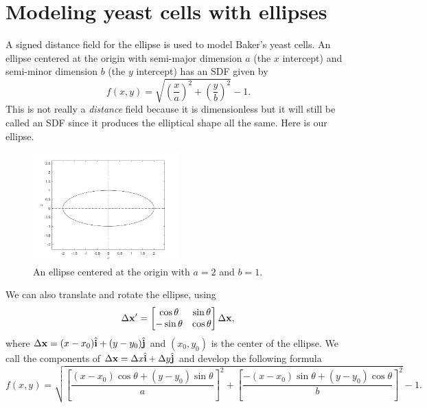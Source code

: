 \section{Modeling yeast cells with ellipses}
A signed distance field for the ellipse is used to model Baker's yeast cells.
An ellipse centered at the origin with semi-major dimension $a$ (the $x$ intercept) and
semi-minor dimension $b$ (the $y$ intercept) has an SDF given by
\begin{equation*}
    f(x,y) = \sqrt{ \left( \frac{x}{a} \right)^2 + \left( \frac{y}{b} \right)^2 } - 1.
\end{equation*}
This is not really a \textit{distance} field because it is 
dimensionless but it will still be called an SDF since it produces the 
elliptical shape all the same. Here is our ellipse.
\begin{figure}[h]
\centering
\includegraphics[width=0.5\textwidth]{chapter1/figures/ellipse_origin.jpg}
\caption{An ellipse centered at the origin with $a = 2$ and $b=1$.}
\label{fig:Ellipse_Centered}
\end{figure}
We can also translate and rotate the ellipse, using
\begin{equation*} 
    \Delta \vb{x}' = 
    \begin{bmatrix}
        \cos{\theta} & \sin{\theta} \\
        -\sin{\theta} & \cos{\theta} 
    \end{bmatrix}
    \Delta \vb{x},
\end{equation*}
where $\Delta \vb{x} = (x-x_0) \hat{\vb{i}} + (y-y_0)\hat{\vb{j}} $ and $(x_0,y_0)$ is the
center of the ellipse. We call the components of $\Delta \vb{x} = \Delta x \hat{\vb{i}} +
\Delta y \hat{\vb{j}} $ and develop the following formula
\begin{equation*}
    f(x,y) = \sqrt{ \left[\frac{ (x-x_0)\cos{\theta} + (y-y_0) \sin{\theta}}{a} \right]^2 
            +       \left[ \frac{-(x-x_0)\sin{\theta} +(y-y_0) \cos{\theta}}{b} \right]^2 } - 1.
\end{equation*}
